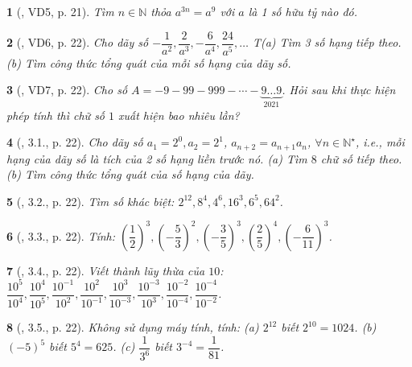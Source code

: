\documentclass{article}
\newtheorem{baitoan}{}
\begin{document}
\begin{baitoan}[\cite{Binh_boi_duong_Toan_7_tap_1}, VD5, p. 21]
	Tìm $n\in\mathbb{N}$ thỏa $a^{3n} = a^9$ với $a$ là 1 số hữu tỷ nào đó.
\end{baitoan}

\begin{baitoan}[\cite{Binh_boi_duong_Toan_7_tap_1}, VD6, p. 22]
	Cho dãy số $-\dfrac{1}{a^2},\dfrac{2}{a^3},-\dfrac{6}{a^4},\dfrac{24}{a^5},\ldots$ T(a) Tìm 3 số hạng tiếp theo. (b) Tìm công thức tổng quát của mỗi số hạng của dãy số.
\end{baitoan}

\begin{baitoan}[\cite{Binh_boi_duong_Toan_7_tap_1}, VD7, p. 22]
	Cho số $A = -9 - 99 - 999 - \cdots - \underbrace{9\ldots9}_{2021}$. Hỏi sau khi thực hiện phép tính thì chữ số $1$ xuất hiện bao nhiêu lần?
\end{baitoan}

\begin{baitoan}[\cite{Binh_boi_duong_Toan_7_tap_1}, 3.1., p. 22]
	Cho dãy số $a_1 = 2^0,a_2 = 2^1$, $a_{n + 2} = a_{n + 1}a_n$, $\forall n\in\mathbb{N}^\star$, i.e., mỗi hạng của dãy số là tích của 2 số hạng liền trước nó. (a) Tìm $8$ chữ số tiếp theo. (b) Tìm công thức tổng quát của số hạng của dãy.
\end{baitoan}

\begin{baitoan}[\cite{Binh_boi_duong_Toan_7_tap_1}, 3.2., p. 22]
	Tìm số khác biệt: $2^{12},8^4,4^6,16^3,6^5,64^2$.
\end{baitoan}

\begin{baitoan}[\cite{Binh_boi_duong_Toan_7_tap_1}, 3.3., p. 22]
	Tính: $\left(\dfrac{1}{2}\right)^3,\left(-\dfrac{5}{3}\right)^2,\left(-\dfrac{3}{5}\right)^3,\left(\dfrac{2}{5}\right)^4,\left(-\dfrac{6}{11}\right)^3$.
\end{baitoan}

\begin{baitoan}[\cite{Binh_boi_duong_Toan_7_tap_1}, 3.4., p. 22]
	Viết thành lũy thừa của $10$: $\dfrac{10^5}{10^4},\dfrac{10^4}{10^5},\dfrac{10^{-1}}{10^2},\dfrac{10^2}{10^{-1}},\dfrac{10^3}{10^{-3}},\dfrac{10^{-3}}{10^3},\dfrac{10^{-2}}{10^{-4}},\dfrac{10^{-4}}{10^{-2}}$.
\end{baitoan}

\begin{baitoan}[\cite{Binh_boi_duong_Toan_7_tap_1}, 3.5., p. 22]
	Không sử dụng máy tính,  tính: (a) $2^{12}$ biết $2^{10} = 1024$. (b) $(-5)^5$ biết $5^4 = 625$. (c) $\dfrac{1}{3^6}$ biết $3^{-4} = \dfrac{1}{81}$.
\end{baitoan}
\end{document}
